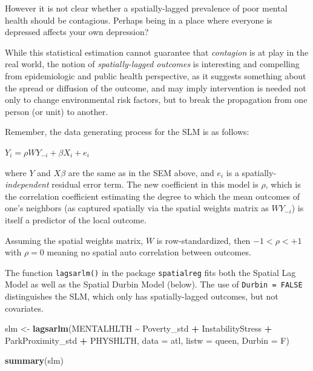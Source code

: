 \documentclass[
]{book}
\newenvironment{Shaded}{\begin{snugshade}}{\end{snugshade}}
\newcommand{\AttributeTok}[1]{\textcolor[rgb]{0.13,0.29,0.53}{#1}}
\newcommand{\FunctionTok}[1]{\textcolor[rgb]{0.13,0.29,0.53}{\textbf{#1}}}
\newcommand{\NormalTok}[1]{#1}
\newcommand{\OtherTok}[1]{\textcolor[rgb]{0.56,0.35,0.01}{#1}}
\newcommand{\SpecialCharTok}[1]{\textcolor[rgb]{0.81,0.36,0.00}{\textbf{#1}}}
\begin{document}
However it is not clear whether a spatially-lagged prevalence of poor mental health should be contagious. Perhaps being in a place where everyone is depressed affects your own depression?

While this statistical estimation cannot guarantee that \emph{contagion} is at play in the real world, the notion of \emph{spatially-lagged outcomes} is interesting and compelling from epidemiologic and public health perspective, as it suggests something about the spread or diffusion of the outcome, and may imply intervention is needed not only to change environmental risk factors, but to break the propagation from one person (or unit) to another.

Remember, the data generating process for the SLM is as follows:

\(Y_i=\rho WY_{-i}+\beta X_i+e_i\)

where \(Y\) and \(X\beta\) are the same as in the SEM above, and \(e_i\) is a spatially-\emph{independent} residual error term. The new coefficient in this model is \(\rho\), which is the correlation coefficient estimating the degree to which the mean outcomes of one's neighbors (as captured spatially via the spatial weights matrix as \(WY_{-i}\)) is itself a predictor of the local outcome.

Assuming the spatial weights matrix, \(W\) is row-standardized, then \(-1<\rho<+1\) with \(\rho=0\) meaning no spatial auto correlation between outcomes.

The function \texttt{lagsarlm()} in the package \texttt{spatialreg} fits both the Spatial Lag Model as well as the Spatial Durbin Model (below). The use of \texttt{Durbin\ =\ FALSE} distinguishes the SLM, which only has spatially-lagged outcomes, but not covariates.

\begin{Shaded}
\begin{Highlighting}[]
\NormalTok{slm }\OtherTok{\textless{}{-}} \FunctionTok{lagsarlm}\NormalTok{(MENTALHLTH }\SpecialCharTok{\textasciitilde{}}\NormalTok{ Poverty\_std }\SpecialCharTok{+}\NormalTok{ InstabilityStress }\SpecialCharTok{+}\NormalTok{ ParkProximity\_std  }\SpecialCharTok{+}\NormalTok{ PHYSHLTH,}
                \AttributeTok{data =}\NormalTok{ atl,}
                \AttributeTok{listw =}\NormalTok{ queen,}
                \AttributeTok{Durbin =}\NormalTok{ F)}

\FunctionTok{summary}\NormalTok{(slm)}
\end{Highlighting}
\end{Shaded}
\end{document}
